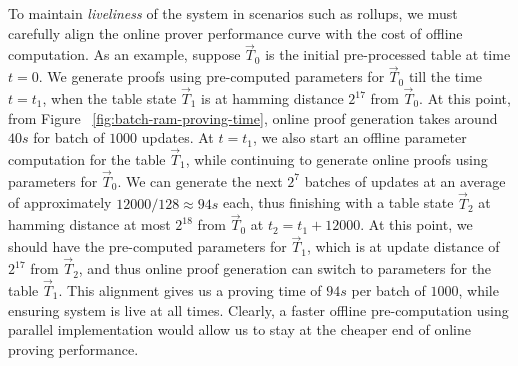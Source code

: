  To maintain {\em liveliness} of the system in scenarios such as rollups, we must carefully
align the online prover performance curve with the cost of offline computation. As an example, suppose $\vec{T}_0$
is the initial pre-processed table at time $t=0$. We generate proofs using pre-computed parameters for $\vec{T}_0$
till the time $t=t_1$, when the table state $\vec{T}_1$ is at hamming distance $2^{17}$ from $\vec{T}_0$. At this point,
from Figure ~\ref{fig:batch-ram-proving-time}, online proof generation takes around $40s$ for batch of $1000$ updates.
At $t=t_1$, we also start an offline parameter computation for the table $\vec{T}_1$, while continuing to generate
online proofs using parameters for $\vec{T}_0$. We can generate the next $2^7$ batches of updates at an average of
approximately $12000/128\approx 94s$ each, thus finishing with a table state $\vec{T}_2$ at hamming distance at most
$2^{18}$ from $\vec{T}_0$ at $t_2=t_1+12000$. At this point, we should have the pre-computed parameters for $\vec{T}_1$,
which is at update distance of $2^{17}$ from $\vec{T}_2$, and thus online proof generation can switch to parameters
for the table $\vec{T}_1$. This alignment gives us a proving time of $94s$ per batch of $1000$, while ensuring system
is live at all times. Clearly, a faster offline pre-computation using parallel implementation would allow us to stay
at the cheaper end of online proving performance.














